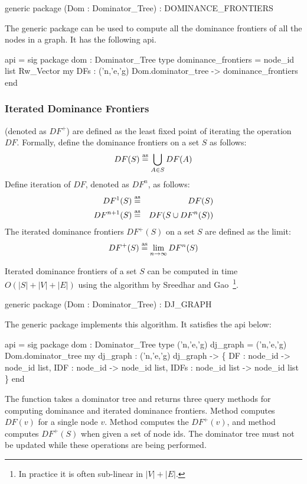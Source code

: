 \begin{SML}
  generic package (Dom : Dominator_Tree) : DOMINANCE_FRONTIERS
\end{SML}
The generic package  can be used to
compute all the dominance frontiers of all the nodes in a graph.
It has the following api. 

\begin{SML}
 api  = sig
   package dom : Dominator_Tree
   type dominance_frontiers = node_id list Rw_Vector
   my DFs : ('n,'e,'g) Dom.dominator_tree -> dominance_frontiers
 end
\end{SML}

\subsubsection{Iterated Dominance Frontiers}

 (denoted as $DF^+$) are defined
as the least fixed point of iterating the operation $DF$. Formally,
define the dominance frontiers on a set $S$ as follows:
\[ 
   DF(S) \stackrel{\rm as}{=} \bigcup_{A \in S} DF(A) 
\]
Define iteration of $DF$, denoted as $DF^n$, as follows:
\begin{eqnarray*}
  DF^1(S)     & \stackrel{\rm as}{=} & DF(S) \\
  DF^{n+1}(S) & \stackrel{\rm as}{=} & DF(S \cup DF^n(S)) \\
\end{eqnarray*}
The iterated dominance frontiers $DF^+(S)$ on a set $S$ are defined as
the limit:
\[  
   DF^+(S) \stackrel{\rm as}{=} \lim_{n \to \infty} DF^n(S) 
\]

Iterated dominance frontiers of a set $S$ can be computed in
time $O(|S|+|V|+|E|)$ using the 
algorithm by Sreedhar and Gao~\cite{linear-time-IDF}\footnote{
In practice it is often sub-linear in $|V|+|E|$.}.

\begin{SML}
  generic package (Dom : Dominator_Tree) : DJ_GRAPH
\end{SML}
The generic package  implements this algorithm.
It satisfies the api below:
\begin{SML}
 api  = sig
    package dom : Dominator_Tree
    type ('n,'e,'g) dj_graph = ('n,'e,'g) Dom.dominator_tree
    my dj_graph : ('n,'e,'g) dj_graph ->
        \{  DF   : node_id -> node_id list,
           IDF  : node_id -> node_id list,
           IDFs : node_id list -> node_id list
        \}
 end
\end{SML}
The function  takes a dominator tree and returns
three query methods for computing dominance and iterated dominance frontiers.
Method  computes $DF(v)$ for a single node $v$.
Method  computes the $DF^+(v)$, and method
 computes $DF^+(S)$ when given a set of node ids.
The dominator tree must not be updated while these operations
are being performed. 

